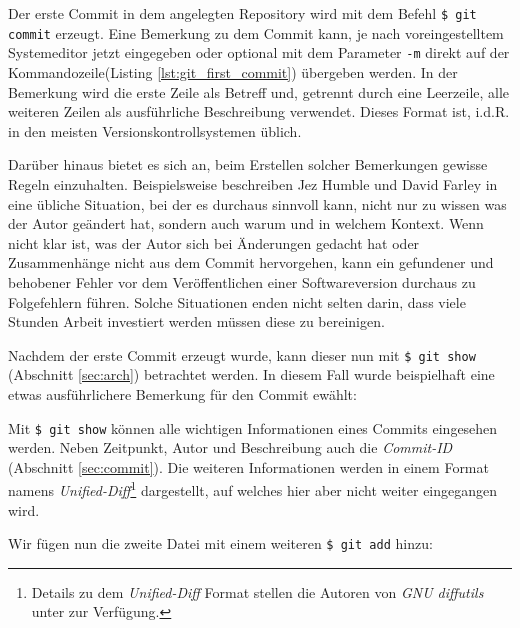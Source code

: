 Der erste Commit in dem angelegten Repository wird mit dem Befehl \texttt{\$
git commit} erzeugt. Eine Bemerkung zu dem Commit kann, je nach
voreingestelltem Systemeditor jetzt eingegeben oder optional mit dem Parameter
\texttt{-m} direkt auf der Kommandozeile(Listing \ref{lst:git_first_commit})
übergeben werden. In der Bemerkung wird die erste Zeile als Betreff und,
getrennt durch eine Leerzeile, alle weiteren Zeilen als ausführliche Beschreibung
verwendet. Dieses Format ist, i.d.R. in den meisten Versionskontrollsystemen
üblich.


Darüber hinaus bietet es sich an, beim Erstellen solcher Bemerkungen gewisse
Regeln einzuhalten. Beispielsweise beschreiben Jez Humble und David Farley in
\cite[S.~37]{cd} eine übliche Situation, bei der es durchaus sinnvoll kann,
nicht nur zu wissen was der Autor geändert hat, sondern auch warum und in
welchem Kontext. Wenn nicht klar ist, was der Autor sich bei Änderungen
gedacht hat oder Zusammenhänge nicht aus dem Commit hervorgehen, kann ein
gefundener und behobener Fehler vor dem Veröffentlichen einer Softwareversion
durchaus zu Folgefehlern führen. Solche Situationen enden nicht selten darin,
dass viele Stunden Arbeit investiert werden müssen diese zu
bereinigen.\cite[S.~37]{cd}

Nachdem der erste Commit erzeugt wurde, kann dieser nun mit \texttt{\$ git
show} (Abschnitt \ref{sec:arch}) betrachtet werden. In diesem Fall wurde
beispielhaft eine etwas ausführlichere Bemerkung für den Commit ewählt:


Mit \texttt{\$ git show} können alle wichtigen Informationen eines Commits
eingesehen werden.  Neben Zeitpunkt, Autor und Beschreibung auch die
\textit{Commit-ID} (Abschnitt \ref{sec:commit}).  Die weiteren Informationen
werden in einem Format namens \textit{Unified-Diff}\footnote{Details zu dem
\textit{Unified-Diff} Format stellen die Autoren von \textit{GNU diffutils}
unter \cite[S.~12-13]{paper:diffutils} zur Verfügung.} dargestellt, auf welches
hier aber nicht weiter eingegangen wird.\cite[25]{gitosp}

Wir fügen nun die zweite Datei mit einem weiteren \texttt{\$ git add} hinzu:


